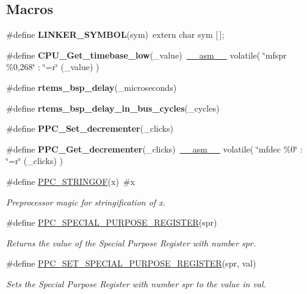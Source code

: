 \subsection*{Macros}
\begin{DoxyCompactItemize}
\item 
\#define {\bfseries L\+I\+N\+K\+E\+R\+\_\+\+S\+Y\+M\+B\+OL}(sym)~extern char sym \mbox{[}$\,$\mbox{]};
\item 
\#define {\bfseries C\+P\+U\+\_\+\+Get\+\_\+timebase\+\_\+low}(\+\_\+value)~\mbox{\hyperlink{group__RTEMSScoreCPUSPARC_ga82257d4fc068f4b21b029dd69d276839}{\+\_\+\+\_\+asm\+\_\+\+\_\+}} volatile( \char`\"{}mfspr \%0,268\char`\"{} \+: \char`\"{}=r\char`\"{} (\+\_\+value) )
\item 
\#define {\bfseries rtems\+\_\+bsp\+\_\+delay}(\+\_\+microseconds)
\item 
\#define {\bfseries rtems\+\_\+bsp\+\_\+delay\+\_\+in\+\_\+bus\+\_\+cycles}(\+\_\+cycles)
\item 
\#define {\bfseries P\+P\+C\+\_\+\+Set\+\_\+decrementer}(\+\_\+clicks)
\item 
\#define {\bfseries P\+P\+C\+\_\+\+Get\+\_\+decrementer}(\+\_\+clicks)~\mbox{\hyperlink{group__RTEMSScoreCPUSPARC_ga82257d4fc068f4b21b029dd69d276839}{\+\_\+\+\_\+asm\+\_\+\+\_\+}} volatile( \char`\"{}mfdec  \%0\char`\"{} \+: \char`\"{}=r\char`\"{} (\+\_\+clicks) )
\item 
\#define \mbox{\hyperlink{group__RTEMSBSPsPowerPCSharedUtility_ga82a438528227ca1a3c0236a75db36931}{P\+P\+C\+\_\+\+S\+T\+R\+I\+N\+G\+OF}}(x)~\#x
\begin{DoxyCompactList}\small\item\em Preprocessor magic for stringification of {\itshape x}. \end{DoxyCompactList}\item 
\#define \mbox{\hyperlink{group__RTEMSBSPsPowerPCSharedUtility_gaf2152a905a3a596e7fd4677e5b7fcbcf}{P\+P\+C\+\_\+\+S\+P\+E\+C\+I\+A\+L\+\_\+\+P\+U\+R\+P\+O\+S\+E\+\_\+\+R\+E\+G\+I\+S\+T\+ER}}(spr)
\begin{DoxyCompactList}\small\item\em Returns the value of the Special Purpose Register with number {\itshape spr}. \end{DoxyCompactList}\item 
\#define \mbox{\hyperlink{group__RTEMSBSPsPowerPCSharedUtility_ga13230983701d0de149fb74885ae2a9e8}{P\+P\+C\+\_\+\+S\+E\+T\+\_\+\+S\+P\+E\+C\+I\+A\+L\+\_\+\+P\+U\+R\+P\+O\+S\+E\+\_\+\+R\+E\+G\+I\+S\+T\+ER}}(spr,  val)
\begin{DoxyCompactList}\small\item\em Sets the Special Purpose Register with number {\itshape spr} to the value in {\itshape val}. \end{DoxyCompactList}\item 

\end{DoxyCompactItemize}
